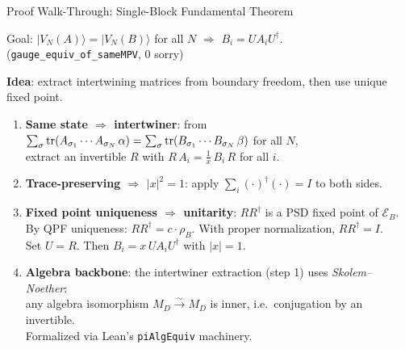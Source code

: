 \documentclass[aspectratio=169,10pt]{beamer}
\begin{document}
\begin{frame}{Proof Walk-Through: Single-Block Fundamental Theorem}
    \vspace{-0.5em}

    {\small\textcolor{dimwhite}{Goal: $|V_N(A)\rangle = |V_N(B)\rangle$ for all $N$
    $\Longrightarrow$ $B_i = U A_i U^\dagger$.
    \quad(\texttt{gauge\_equiv\_of\_sameMPV}, 0 sorry)}}

    \vspace{0.3em}
    \textbf{Idea}: extract intertwining matrices from boundary freedom,
    then use unique fixed point.

    \begin{enumerate}\itemsep0.12em\small
        \item \textbf{Same state $\Rightarrow$ intertwiner}:
            from $\sum_\sigma \mathrm{tr}(A_{\sigma_1}\cdots A_{\sigma_N}\,\alpha)
            = \sum_\sigma \mathrm{tr}(B_{\sigma_1}\cdots B_{\sigma_N}\,\beta)$
            for all $N$,\\
            extract an invertible $R$ with
            $R\,A_i = \frac{1}{x}\,B_i\,R$ for all $i$.

        \item \textbf{Trace-preserving $\Rightarrow$ $|x|^2 = 1$}:
            apply $\sum_i (\cdot)^\dagger (\cdot) = I$ to both sides.

        \item \textbf{Fixed point uniqueness $\Rightarrow$ unitarity}:
            $R R^\dagger$ is a PSD fixed point of $\mathcal{E}_B$.\\
            By QPF uniqueness: $R R^\dagger = c \cdot \rho_B$.
            With proper normalization, $R R^\dagger = I$.\\
            Set $U = R$. Then $B_i = x\, U A_i U^\dagger$
            with $|x| = 1$.

        \item \textbf{Algebra backbone}: the intertwiner extraction
            (step 1) uses
            \emph{Skolem--Noether}:\\
            {\footnotesize any algebra isomorphism $M_D \xrightarrow{\sim} M_D$ is inner,
            i.e.\ conjugation by an invertible.}\\
            {\footnotesize Formalized via Lean's \texttt{piAlgEquiv} machinery.}
    \end{enumerate}


\end{frame}
\end{document}
